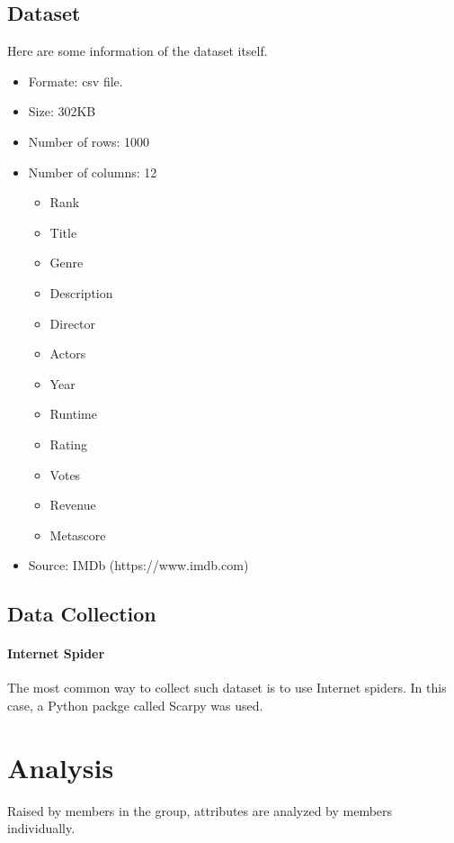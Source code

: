 \documentclass[10pt]{article}
\begin{document}
\begin{CJK}{UTF8}{gbsn}
            \subsection{Dataset}
            Here are some information of the dataset itself.
            \begin{itemize}
                \item Formate: csv file.
                \item Size: 302KB
                \item Number of rows: 1000
                \item Number of columns: 12
                \begin{itemize}
                    \item Rank
                    \item Title
                    \item Genre
                    \item Description
                    \item Director
                    \item Actors
                    \item Year
                    \item Runtime
                    \item Rating
                    \item Votes
                    \item Revenue
                    \item Metascore
                \end{itemize}
                \item Source: IMDb (https://www.imdb.com)
            \end{itemize}
            \subsection{Data Collection}
            \paragraph{Internet Spider}
            The most common way to collect such dataset is to use Internet spiders. In this case, a Python packge called Scarpy was used. 
        \section{Analysis}
        Raised by members in the group, attributes are analyzed by members individually.

\end{CJK}
\end{document}
